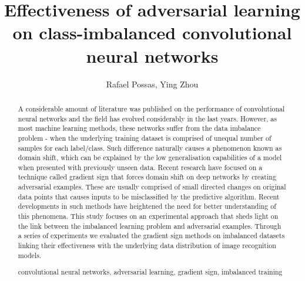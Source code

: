 \documentclass[runningheads,a4paper]{llncs}
\newcommand{\keywords}[1]{\par\addvspace\baselineskip
\noindent\keywordname\enspace\ignorespaces#1}
\begin{document}
\mainmatter  %

\title{Effectiveness of adversarial learning on class-imbalanced convolutional neural networks}

%
%
\author{Rafael Possas, Ying Zhou}
%


%
%

\maketitle


\begin{abstract}
A considerable amount of literature was published on the performance of convolutional neural networks  and the field has evolved considerably in the last years. However, as most machine learning methods, these networks suffer from the data imbalance problem - when the underlying training dataset is comprised of unequal number of samples for each label/class. Such difference naturally causes a phenomenon known as domain shift, which can be explained by the low generalisation capabilities of a model when presented with previously unseen data. Recent research have focused on a technique called gradient sign that forces domain shift on deep networks by creating adversarial examples. These are usually comprised of small directed changes on original data points that causes inputs to be misclassified by the predictive algorithm. Recent developments in such methods have heightened the need for better understanding of this phenomena. This study focuses on an experimental approach that sheds light on the link between the imbalanced learning problem and adversarial examples. Through a series of experiments we evaluated the gradient sign methods on imbalanced datasets linking their effectiveness with the underlying data distribution of image recognition models.
\keywords{convolutional neural networks, adversarial learning, gradient sign, imbalanced training}
\end{abstract}
\end{document}
